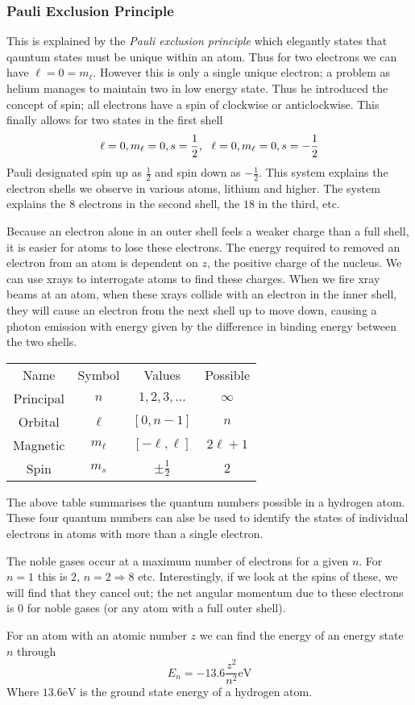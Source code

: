 \documentclass[12pt]{report}
\begin{document}
\begin{flushleft}
\subsubsection*{Pauli Exclusion Principle}

This is explained by the \textit{Pauli exclusion principle} which elegantly
states that qauntum states must be unique within an atom. Thus for two
electrons we can have \(\ell = 0 = m_\ell\). However this is only a single
unique electron; a problem as helium manages to maintain two in low energy
state. Thus he introduced the concept of spin; all electrons have a spin of
clockwise or anticlockwise. This finally allows for two states in the first
shell
\[\ell = 0, m_\ell = 0, s = \frac{1}{2}, \:\:\:
\ell = 0, m_\ell = 0, s = -\frac{1}{2}\]
Pauli designated spin up as \(\frac{1}{2}\) and spin down as \(-\frac{1}{2}\).
This system explains the electron shells we observe in various atoms, lithium
and higher. The system explains the \(8\) electrons in the second shell, the
\(18\) in the third, etc. \par
Because an electron alone in an outer shell feels a weaker charge than a full
shell, it is easier for atoms to lose these electrons. The energy required to
removed an electron from an atom is dependent on \(z\), the positive charge of
the nucleus. We can use xrays to interrogate atoms to find these charges. When
we fire xray beams at an atom, when these xrays collide with an electron in the
inner shell, they will cause an electron from the next shell up to move down,
causing a photon emission with energy given by the difference in binding energy
between the two shells.

\begin{center}    
    \begin{tabular}{|c|c|c|c|}
        Name & Symbol & Values & Possible \\
        Principal & \(n\) & \(1, 2, 3, ...\) & \(\infty\) \\
        Orbital & \(\ell\) & \([0, n - 1]\) & \(n\) \\
        Magnetic & \(m_\ell\) & \([-\ell, \ell]\) & \(2\ell + 1\) \\
        Spin & \(m_s\) & \(\pm\frac{1}{2}\) & \(2\) \\
    \end{tabular}
\end{center}

The above table summarises the quantum numbers possible in a hydrogen atom.
These four quantum numbers can alse be used to identify the states of
individual electrons in atoms with more than a single electron. \par
The noble gases occur at a maximum number of electrons for a given \(n\).
For \(n = 1\) this is \(2\), \(n = 2 \Rightarrow 8\) etc. Interestingly, if
we look at the spins of these, we will find that they cancel out; the net
angular momentum due to these electrons is \(0\) for noble gases (or any atom
with a full outer shell). \par
For an atom with an atomic number \(z\) we can find the energy of an energy
state \(n\) through
\[E_n = -13.6\frac{z^2}{n^2}\mathrm{eV}\]
Where \(13.6\mathrm{eV}\) is the ground state energy of a hydrogen atom.


\end{flushleft}
\end{document}
